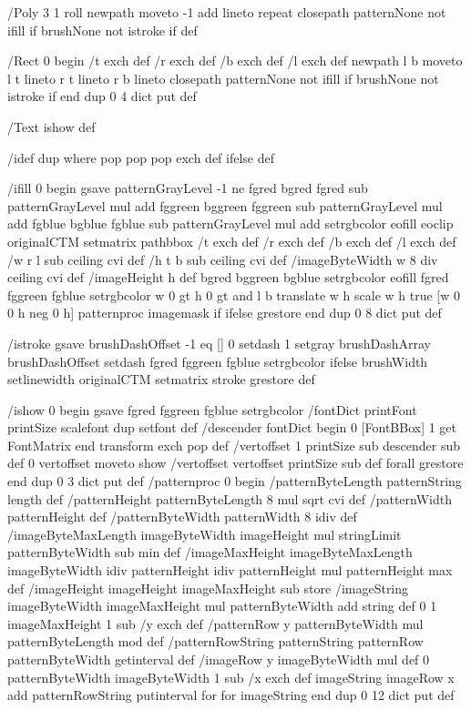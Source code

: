 /Poly {
3 1 roll
newpath
moveto
-1 add
{ lineto } repeat
closepath
patternNone not { ifill } if
brushNone not { istroke } if
} def

/Rect {
0 begin
/t exch def
/r exch def
/b exch def
/l exch def
newpath
l b moveto
l t lineto
r t lineto
r b lineto
closepath
patternNone not { ifill } if
brushNone not { istroke } if
end
} dup 0 4 dict put def

/Text {
ishow
} def

/idef {
dup where { pop pop pop } { exch def } ifelse
} def

/ifill {
0 begin
gsave
patternGrayLevel -1 ne {
fgred bgred fgred sub patternGrayLevel mul add
fggreen bggreen fggreen sub patternGrayLevel mul add
fgblue bgblue fgblue sub patternGrayLevel mul add setrgbcolor
eofill
} {
eoclip
originalCTM setmatrix
pathbbox /t exch def /r exch def /b exch def /l exch def
/w r l sub ceiling cvi def
/h t b sub ceiling cvi def
/imageByteWidth w 8 div ceiling cvi def
/imageHeight h def
bgred bggreen bgblue setrgbcolor
eofill
fgred fggreen fgblue setrgbcolor
w 0 gt h 0 gt and {
l b translate w h scale
w h true [w 0 0 h neg 0 h] { patternproc } imagemask
} if
} ifelse
grestore
end
} dup 0 8 dict put def

/istroke {
gsave
brushDashOffset -1 eq {
[] 0 setdash
1 setgray
} {
brushDashArray brushDashOffset setdash
fgred fggreen fgblue setrgbcolor
} ifelse
brushWidth setlinewidth
originalCTM setmatrix
stroke
grestore
} def

/ishow {
0 begin
gsave
fgred fggreen fgblue setrgbcolor
/fontDict printFont printSize scalefont dup setfont def
/descender fontDict begin 0 [FontBBox] 1 get FontMatrix end
transform exch pop def
/vertoffset 1 printSize sub descender sub def {
0 vertoffset moveto show
/vertoffset vertoffset printSize sub def
} forall
grestore
end
} dup 0 3 dict put def
/patternproc {
0 begin
/patternByteLength patternString length def
/patternHeight patternByteLength 8 mul sqrt cvi def
/patternWidth patternHeight def
/patternByteWidth patternWidth 8 idiv def
/imageByteMaxLength imageByteWidth imageHeight mul
stringLimit patternByteWidth sub min def
/imageMaxHeight imageByteMaxLength imageByteWidth idiv patternHeight idiv
patternHeight mul patternHeight max def
/imageHeight imageHeight imageMaxHeight sub store
/imageString imageByteWidth imageMaxHeight mul patternByteWidth add string def
0 1 imageMaxHeight 1 sub {
/y exch def
/patternRow y patternByteWidth mul patternByteLength mod def
/patternRowString patternString patternRow patternByteWidth getinterval def
/imageRow y imageByteWidth mul def
0 patternByteWidth imageByteWidth 1 sub {
/x exch def
imageString imageRow x add patternRowString putinterval
} for
} for
imageString
end
} dup 0 12 dict put def

